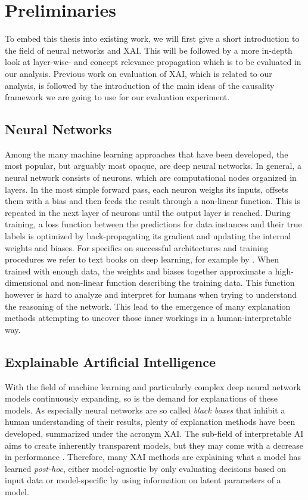 \chapter{Preliminaries}\label{chapter:background}

To embed this thesis into existing work, we will first give a short introduction to the field of neural networks and XAI. This will be followed by a more in-depth look at layer-wise- and concept relevance propagation which is to be evaluated in our analysis. Previous work on evaluation of XAI, which is related to our analysis, is followed by the introduction of the main ideas of the causality framework we are going to use for our evaluation experiment. 

\section{Neural Networks}
Among the many machine learning approaches that have been developed, the most popular, but arguably most opaque, are deep neural networks. In general, a neural network consists of neurons, which are computational nodes organized in layers. In the most simple forward pass, each neuron weighs its inputs, offsets them with a bias and then feeds the result through a non-linear function. This is repeated in the next layer of neurons until the output layer is reached. During training, a loss function between the predictions for data instances and their true labels is optimized by back-propagating its gradient and updating the internal weights and biases. For specifics on successful architectures and training procedures we refer to text books on deep learning, for example by \cite{Goodfellow2016}. When trained with enough data, the weights and biases together approximate a high-dimensional and non-linear function describing the training data. This function however is hard to analyze and interpret for humans when trying to understand the reasoning of the network. This lead to the emergence of many explanation methods attempting to uncover those inner workings in a human-interpretable way.


\section{Explainable Artificial Intelligence}
With the field of machine learning and particularly complex deep neural network models continuously expanding, so is the demand for explanations of these models.
As especially neural networks are so called \textit{black boxes} that inhibit a human understanding of their results, plenty of explanation methods have been developed, summarized under the acronym XAI. The sub-field of interpretable AI aims to create inherently transparent models, but they may come with a decrease in performance \cite{Lipton2018}. Therefore, many XAI methods are explaining what a model has learned \textit{post-hoc}, either model-agnostic by only evaluating decisions based on input data or model-specific by using information on latent parameters of a model.

